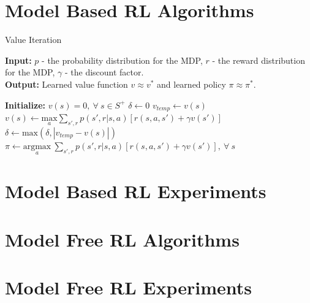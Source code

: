 \documentclass{article}
\begin{document}
\section{Model Based RL Algorithms}\label{sec:model_appendix}
\begin{algorithm}[H]
\caption{Value Iteration}\label{euclid}
\hspace*{\algorithmicindent} \textbf{Input:} $p$ - the probability distribution for the MDP, $r$ - the reward distribution for the MDP, $\gamma$ - the discount factor. \\
\hspace*{\algorithmicindent} \textbf{Output:} Learned value function $v \approx v^*$ and learned policy $\pi \approx \pi^*$.
\begin{algorithmic}[1]
\State \textbf{Initialize:} $v(s) = 0, \ \forall \ s \in S^+$
\State $\delta \gets 0$ 
\State $v_{temp} \gets v(s)$
\State $v(s) \gets \underset{a}{\text{max}} \sum_{s', r}p(s',r|s,a)[r(s,a,s') + \gamma v(s')]$
\State $\delta \gets \text{max}(\delta, |v_{temp} - v(s)|)$
\EndFor
\If{$\delta < \epsilon$}
\State {}
\EndIf
\EndWhile
\State $\pi \gets \underset{a}{\text{argmax}} \ \sum_{s',r} p(s',r|s,a)[r(s,a,s') + \gamma v(s')], \ \forall \ s$
\EndProcedure
\end{algorithmic}
\end{algorithm}


\section{Model Based RL Experiments}\label{sec:model_exp_appendix}

\section{Model Free RL Algorithms}\label{sec:model_free_appendix}


\section{Model Free RL Experiments}\label{sec:model_free_exp_appendix}
\end{document}
